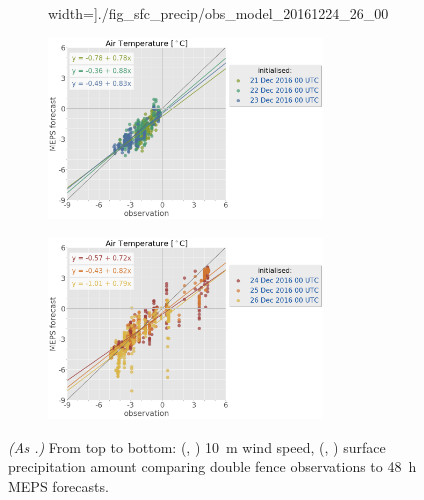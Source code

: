 \begin{figure}
\begin{subfigure}[b]{0.49\textwidth}
		width=\textwidth]{./fig_sfc_precip/obs_model_20161224_26_00}
		\caption{}\label{fig:scat:precip2426}
	\end{subfigure}
	\begin{subfigure}[b]{0.49\textwidth}
		\centering
		\includegraphics[trim={25.cm 15.5cm 0cm 3.6cm},clip,
		width=0.8\textwidth]{./fig_sfc_temp/obs_model_20161221_23_00_label}
	\end{subfigure}
	\begin{subfigure}[b]{0.49\textwidth}
		\centering
		\includegraphics[trim={25.cm 15.5cm 0cm 3.6cm},clip,
		width=0.8\textwidth]{./fig_sfc_temp/obs_model_20161224_26_00_label}
	\end{subfigure}
    \caption{\textit{(As .)} From top to bottom: (\protect{}, \protect{}) \SI{10}{\metre} wind speed, (\protect{}, \protect{}) surface precipitation amount comparing double fence observations to \SI{48}{\hour} MEPS forecasts.} \label{fig:scat:WS_precip}
\end{figure}
\noindent
\\
\\
